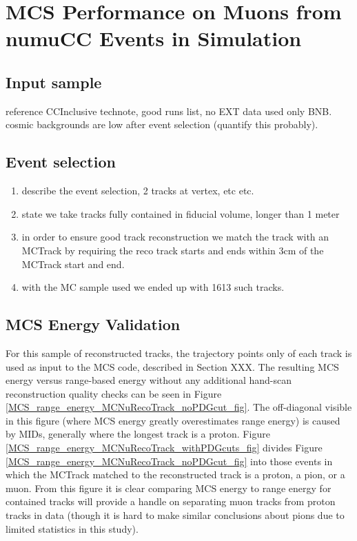 \section{MCS Performance on Muons from numuCC Events in Simulation}\label{MC_performance_section}

\subsection{Input sample}
reference CCInclusive technote, good runs list, no EXT data used only BNB. cosmic backgrounds are low after event selection (quantify this probably).

\subsection{Event selection}
\begin{enumerate}
\item describe the event selection, 2 tracks at vertex, etc etc.
\item state we take tracks fully contained in fiducial volume, longer than 1 meter
\item in order to ensure good track reconstruction we match the track with an MCTrack by requiring the reco track starts and ends within 3cm of the MCTrack start and end.
\item with the MC sample used we ended up with 1613 such tracks.
\end{enumerate}

\subsection{MCS Energy Validation}\label{MCS_Energy_Validation_MCNuRecoTrack_section}
For this sample of reconstructed tracks, the trajectory points only of each track is used as input to the MCS code, described in Section XXX. The resulting MCS energy versus range-based energy without any additional hand-scan reconstruction quality checks can be seen in Figure \ref{MCS_range_energy_MCNuRecoTrack_noPDGcut_fig}. The off-diagonal visible in this figure (where MCS energy greatly overestimates range energy) is caused by MIDs, generally where the longest track is a proton. Figure \ref{MCS_range_energy_MCNuRecoTrack_withPDGcuts_fig} divides Figure \ref{MCS_range_energy_MCNuRecoTrack_noPDGcut_fig} into those events in which the MCTrack matched to the reconstructed track is a proton, a pion, or a muon. From this figure it is clear comparing MCS energy to range energy for contained tracks will provide a handle on separating muon tracks from proton tracks in data (though it is hard to make similar conclusions about pions due to limited statistics in this study).\\

